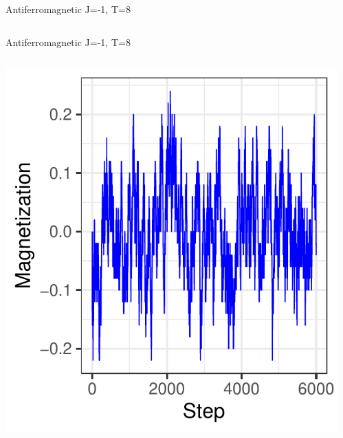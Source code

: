 \documentclass{beamer}
\begin{document}
\begin{frame}{Antiferromagnetic J=-1, T=8}
\begin{columns}
\begin{column}{0.5\textwidth}
\begin{center}
     \end{center}
\end{column}
\end{columns}
\end{frame}

\begin{frame}{Antiferromagnetic J=-1, T=8}
\begin{columns}
\begin{column}{0.5\textwidth}
    \begin{center}
     \includegraphics[width=\textwidth]{Pic/J-1_60_2500_T=8_Magnetization.pdf}
     \end{center}
\end{column}
\begin{column}{0.5\textwidth}
    \begin{center}

\end{center}
\end{column}
\end{columns}
\end{frame}
\end{document}
